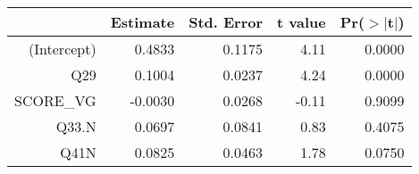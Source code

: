 \begin{table}[ht]
\centering
\begin{tabular}{rrrrr}
  \hline
 & Estimate & Std. Error & t value & Pr($>$$|$t$|$) \\ 
  \hline
(Intercept) & 0.4833 & 0.1175 & 4.11 & 0.0000 \\ 
  Q29 & 0.1004 & 0.0237 & 4.24 & 0.0000 \\ 
  SCORE\_VG & -0.0030 & 0.0268 & -0.11 & 0.9099 \\ 
  Q33.N & 0.0697 & 0.0841 & 0.83 & 0.4075 \\ 
  Q41N & 0.0825 & 0.0463 & 1.78 & 0.0750 \\ 
   \hline
\end{tabular}
\end{table}
